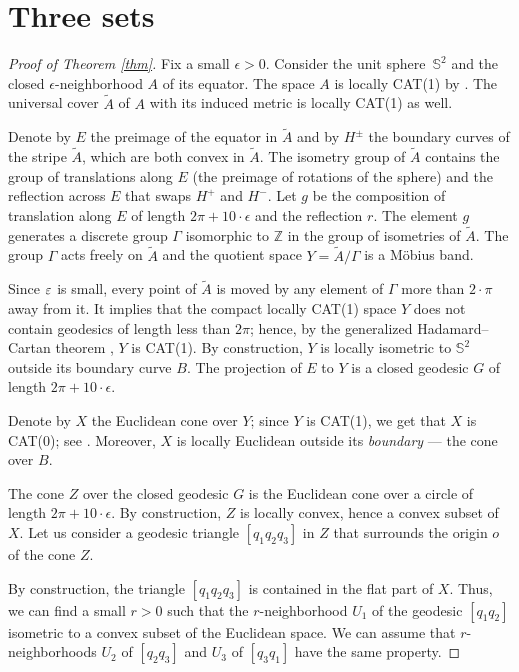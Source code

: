\documentclass[a4paper,10pt]{article}
\begin{document}
\section{Three sets}

\begin{proof}[Proof of Theorem \ref{thm}]
Fix a small $\epsilon >0$.
Consider the unit sphere~$\mathbb{S}^2$ and the closed 
$\epsilon$-neighborhood $A$ of its equator.
The space $A$ is locally CAT(1) by \cite {ABB-1993}.
The universal cover $\tilde A$ of $A$ with its induced metric is locally CAT(1) as well. 

Denote by $E$ the preimage of the equator in $\tilde A$  and by $H^{\pm}$ the boundary curves of the stripe $\tilde A$, which are both convex in $\tilde A$.
The isometry group of $\tilde A$ 
contains the group of translations  along $E$ (the preimage of rotations of the sphere) and 
the reflection across $E$ that swaps $H^+$ and $H^-$.
Let $g$   be the composition of translation along $E$  of length $2\pi +10\cdot\epsilon$  and the reflection $r$.
The element $g$ generates a discrete group $\Gamma$ isomorphic to $\mathbb Z$ in the group of isometries  of $\tilde A$.
The group $\Gamma$ acts freely on $\tilde A$ and the quotient space $Y =\tilde A/\Gamma$ is a Möbius band.

Since $\varepsilon$ is small, every point of $\tilde A$ is moved by any element of $\Gamma$ more than $2\cdot\pi$ away from it.
It implies that the compact locally CAT(1) space $Y$ does not  contain geodesics of length less than $2\pi$;
hence, by  the generalized Hadamard--Cartan theorem \cite{AKP}, $Y$ is CAT(1).
By construction, $Y$ is locally isometric to $\mathbb{S}^2$ outside its boundary curve $B$.
The projection of $E$ to $Y$ is a closed geodesic $G$ of length $2\pi +10\cdot\epsilon$.

Denote by $X$ the Euclidean cone over $Y$;
since $Y$ is CAT(1), we get that $X$ is CAT(0); see \cite{AKP}.
Moreover, $X$ is locally Euclidean outside its \emph{boundary} --- the cone over $B$.

The cone $Z$ over the closed geodesic $G$ is  the Euclidean cone over a circle of length $2\pi +10\cdot\epsilon$. By construction,
$Z$ is locally convex, hence a convex subset of~$X$.
Let us consider a geodesic triangle
$[q_1q_2q_3]$
in $Z$ that surrounds the origin $o$ of the cone $Z$.

By construction, the triangle $[q_1q_2q_3]$ is contained in the flat part of $X$.
Thus, we can find a small $r>0$ such that the $r$-neighborhood $U_1$ of the geodesic $[q_1q_2]$ isometric to a convex subset of the Euclidean space.
We can assume that $r$-neighborhoods $U_2$ of $[q_2q_3]$ and $U_3$ of $[q_3q_1]$ have the same property.


\end{proof}
\end{document}
